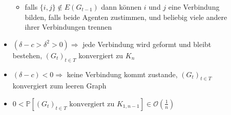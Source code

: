 \begin{description}
\begin{itemize}
\begin{itemize}
						\item falls $\{i,j\}\notin E(G_{t-1})$ dann können $i$ und $j$ eine Verbindung bilden, falls beide Agenten zustimmen, und beliebig viele andere ihrer Verbindungen trennen
					\end{itemize}
				\item $(\delta-c>\delta^2>0)\Rightarrow$ jede Verbindung wird geformt und bleibt bestehen, $(G_t)_{t\in T}$ konvergiert zu $K_n$
				\item $(\delta-c)<0\Rightarrow$ keine Verbindung kommt zustande, $(G_t)_{t\in T}$ konvergiert zum leeren Graph
				\item $0<\mathbb{P}[(G_t)_{t\in T}\text{ konvergiert zu }K_{1,n-1}]\in \mathcal{O}(\frac{1}{n})$
			\end{itemize}
	\end{description}